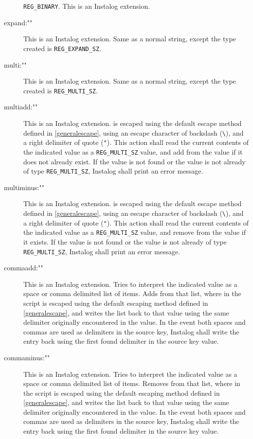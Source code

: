 \begin{description}
\verb|REG_BINARY|. This is an Instalog extension.
\item[expand:"\var{String}"] This is an Instalog extension. Same as a normal
string, except the type created is \verb|REG_EXPAND_SZ|.
\item[multi:"\var{String}"] This is an Instalog extension. Same as a normal
string, except the type created is \verb|REG_MULTI_SZ|.
\item[multiadd:"\var{String}"] This is an Instalog extension.  is
escaped using the default escape method defined in \ref{generalescape}, using an
escape character of backslash (\verb|\|), and a right delimiter of quote
(\verb|"|). This action shall read the current contents of the indicated value
as a \verb|REG_MULTI_SZ| value, and add  from the value if it does
not already exist. If the value is not found or the value is not already of
type \verb|REG_MULTI_SZ|, Instalog shall print an error message.
\item[multiminus:"\var{String}"] This is an Instalog extension.  is
escaped using the default escape method defined in \ref{generalescape}, using an
escape character of backslash (\verb|\|), and a right delimiter of quote
(\verb|"|). This action shall read the current contents of the indicated value
as a \verb|REG_MULTI_SZ| value, and remove  from the value if it
exists. If the value is not found or the value is not already of type
\verb|REG_MULTI_SZ|, Instalog shall print an error message.
\item[commaadd:"\var{String}"] This is an Instalog extension. Tries to
interpret the indicated value as a space or comma delimited list of items.
Adds  from that list, where in the script  is escaped
using the default escaping method defined in \ref{generalescape}, and writes the
list back to that value using the same delimiter originally encountered in the
value. In the event both spaces and commas are used as delimiters in the source
key, Instalog shall write the entry back using the first found delimiter in the
source key value.
\item[commaminus:"\var{String}"] This is an Instalog extension. Tries to
interpret the indicated value as a space or comma delimited list of items.
Removes  from that list, where in the script  is escaped
using the default escaping method defined in \ref{generalescape}, and writes the
list back to that value using the same delimiter originally encountered in the
value. In the event both spaces and commas are used as delimiters in the source
key, Instalog shall write the entry back using the first found delimiter in the
source key value.
\end{description}

